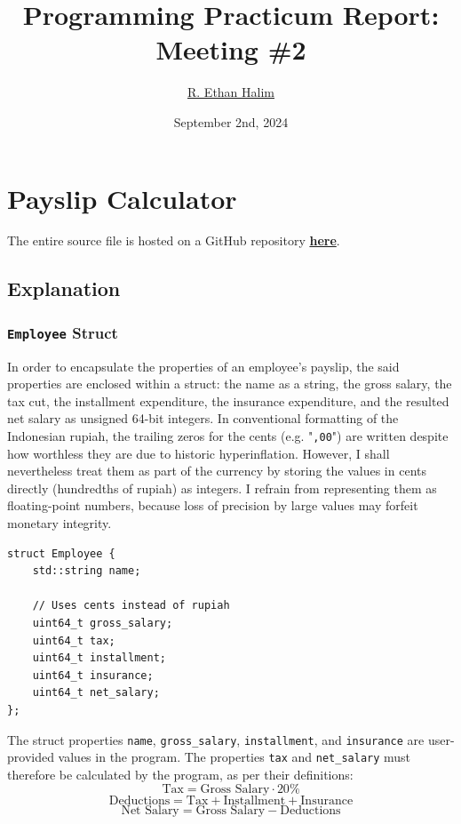 \documentclass[12pt]{article}
\title{Programming Practicum Report:\\Meeting \#2}
\author{\href{https://github.com/avaxar}{R. Ethan Halim}}
\date{September 2nd, 2024}
\begin{document}
\maketitle

\section{Payslip Calculator}
The entire source file is hosted on a GitHub repository \href{https://github.com/avaxar/uni-practica-1/tree/main/week_2/01_payslip}{\textbf{here}}.

\subsection{Explanation}

\subsubsection{\texttt{Employee} Struct}

In order to encapsulate the properties of an employee's payslip, the said properties are enclosed within a struct: the name as a string, the gross salary, the tax cut, the installment expenditure, the insurance expenditure, and the resulted net salary as unsigned 64-bit integers. In conventional formatting of the Indonesian rupiah, the trailing zeros for the cents (e.g. "\texttt{,00}") are written despite how worthless they are due to historic hyperinflation. However, I shall nevertheless treat them as part of the currency by storing the values in cents directly (hundredths of rupiah) as integers. I refrain from representing them as floating-point numbers, because loss of precision by large values may forfeit monetary integrity.

\begin{verbatim}
struct Employee {
    std::string name;

    // Uses cents instead of rupiah
    uint64_t gross_salary;
    uint64_t tax;
    uint64_t installment;
    uint64_t insurance;
    uint64_t net_salary;
};
\end{verbatim}

\pagebreak
The struct properties \texttt{name}, \texttt{gross\_salary}, \texttt{installment}, and \texttt{insurance} are user-provided values in the program. The properties \texttt{tax} and \texttt{net\_salary} must therefore be calculated by the program, as per their definitions:
$$\text{Tax} = \text{Gross Salary} \cdot 20\%$$
$$\text{Deductions} = \text{Tax} + \text{Installment} + \text{Insurance}$$
$$\text{Net Salary} = \text{Gross Salary} - \text{Deductions}$$
\end{document}
